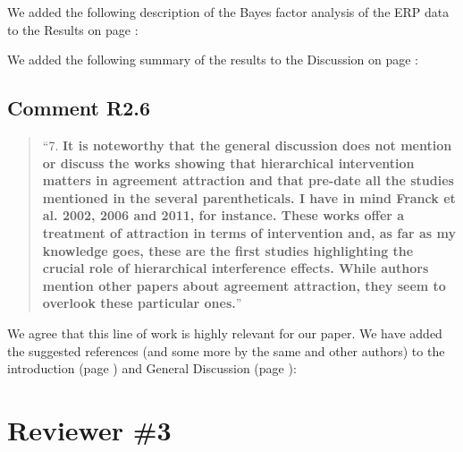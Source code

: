 \documentclass[12pt]{article}
\begin{document}
\begin{quote}
\end{quote}

\noindent We added the following description of the Bayes factor analysis of the ERP data to the Results on page \pageref{ERP_results3}:

\begin{quote}
\end{quote}

\noindent We added the following summary of the results to the Discussion on page \pageref{ERP_discussion}:

\begin{quote}
\end{quote}

\subsection*{Comment R2.6}
\begin{quote}
``7. \textbf{It is noteworthy that the general discussion does not mention or discuss the works showing that hierarchical intervention matters in agreement attraction and that pre-date all the studies mentioned in the several parentheticals. I have in mind Franck et al. 2002, 2006 and 2011, for instance. These works offer a treatment of attraction in terms of intervention and, as far as my knowledge goes, these are the first studies highlighting the crucial role of hierarchical interference effects. While authors mention other papers about agreement attraction, they seem to overlook these particular ones.}''
\end{quote}

We agree that this line of work is highly relevant for our paper. We have added the suggested references (and some more by the same and other authors) to the introduction (page \pageref{franck_refs}) and General Discussion (page \pageref{future_work}):

\begin{quote}
\end{quote}

\begin{quote}
\end{quote}

\section*{Reviewer \#3} 
\end{document}
